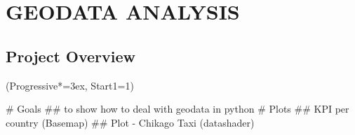 \documentclass[12pt, a4paper]{article}
\let\OldEasylist\easylist
\let\OldEndEasylist\endeasylist
\renewenvironment{easylist}{%
    \OldEasylist%
    \ListProperties(Progressive*=3ex, Start1=1)%
}{%
    \OldEndEasylist%
}%
\begin{document}
\newpage
\section{GEODATA ANALYSIS}

\subsection{Project Overview}
\begin{easylist}
# Goals
## to show how to deal with geodata in python
# Plots
## KPI per country (Basemap)
 ## Plot - Chikago Taxi (datashader)
\end{easylist}






\newpage
\nocite{*}


\end{document}
